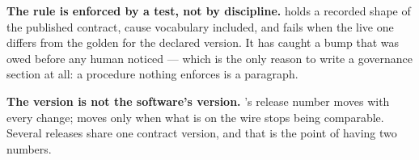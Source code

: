 \begin{note}
\textbf{The rule is enforced by a test, not by discipline.}  holds a
recorded shape of the published contract, cause vocabulary included, and fails when the live
one differs from the golden for the declared version. It has caught a bump that was owed
before any human noticed --- which is the only reason to write a governance section at all: a
procedure nothing enforces is a paragraph.
\end{note}

\begin{warning}
\textbf{The version is not the software's version.} \prog's release number moves with every
change;  moves only when what is on the wire stops being comparable.
Several releases share one contract version, and that is the point of having two numbers.
\end{warning}
